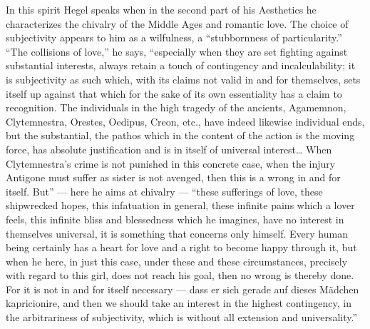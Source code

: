 \documentclass[12pt,a4paper,openany]{book}
\newcommand{\opage}[1]{\marginnote{\footnotesize\textit{[#1]}}}
\begin{document}
In this spirit Hegel speaks when in the second part
of his Aesthetics he characterizes the chivalry of the Middle Ages
and romantic love. The choice of subjectivity
appears to him as a wilfulness, a ``stubbornness of particularity.'' ``The collisions of love,''
he says, ``especially when they are set fighting against substantial
interests, always retain a touch of contingency and incalculability;
it is subjectivity as such which, with
its claims not valid in and for themselves, sets itself up
against that which for the sake of its own essentiality has
\setcounter{footnote}{0}%
\opage{594}a claim to recognition. The individuals in the high tragedy of the ancients,
Agamemnon, Clytemnestra, Orestes, Oedipus,
Creon, etc., have indeed likewise individual ends,
but the substantial, the pathos which in the content of the action
is the moving force, has absolute
justification and is in itself of universal interest\dots{}
When Clytemnestra's crime is not punished in this concrete case,
when the injury Antigone must suffer as
sister is not avenged, then this is a wrong in and for itself.
But'' --- here he aims at chivalry --- ``these
sufferings of love, these shipwrecked hopes,
this infatuation in general, these infinite pains
which a lover feels, this infinite bliss and
blessedness which he imagines, have no interest in themselves
universal, it is something that concerns only
himself. Every human being certainly has a heart for
love and a right to become happy through it, but
when he here, in just this case, under these and these
circumstances, precisely with regard to this girl,
does not reach his goal, then no wrong is thereby done.
For it is not in and for itself necessary --- dass er sich
gerade auf dieses Mädchen kapricionire, and then we should
take an interest in the highest contingency, in the arbitrariness
of subjectivity, which is without all extension
and universality.''
\end{document}

